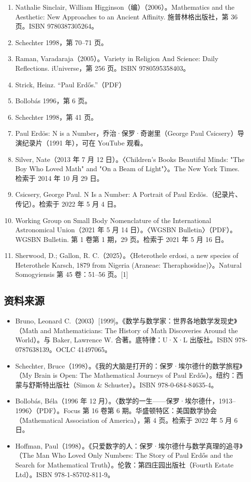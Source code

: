 \begin{enumerate}
\item Nathalie Sinclair, William Higginson（编）（2006）。Mathematics and the Aesthetic: New Approaches to an Ancient Affinity. 施普林格出版社，第 36 页。ISBN 9780387305264。
\item Schechter 1998，第 70–71 页。
\item Raman, Varadaraja（2005）。Variety in Religion And Science: Daily Reflections. iUniverse，第 256 页。ISBN 9780595358403。
\item Strick, Heinz. “Paul Erdős.”（PDF）
\item Bollobás 1996，第 6 页。
\item Schechter 1998，第 41 页。
\item Paul Erdös: N is a Number，乔治·保罗·奇谢里（George Paul Csicsery）导演纪录片（1991 年），可在 YouTube 观看。
\item Silver, Nate（2013 年 7 月 12 日）。〈Children’s Books Beautiful Minds: "The Boy Who Loved Math" and "On a Beam of Light"〉。The New York Times. 检索于 2014 年 10 月 29 日。
\item Csicsery, George Paul. N Is a Number: A Portrait of Paul Erdös.（纪录片、传记）。检索于 2022 年 5 月 4 日。
\item Working Group on Small Body Nomenclature of the International Astronomical Union（2021 年 5 月 14 日）。〈WGSBN Bulletin〉（PDF）。WGSBN Bulletin. 第 1 卷第 1 期，29 页。检索于 2021 年 5 月 16 日。
\item Sherwood, D.; Gallon, R. C.（2025）。〈Heterothele erdosi, a new species of Heterothele Karsch, 1879 from Nigeria (Araneae: Theraphosidae)〉。Natural Somogyiensis 第 45 卷：51–56 页。[1]
\end{enumerate}
\subsection{资料来源}
\begin{itemize}
\item Bruno, Leonard C.（2003）[1999]。《数学与数学家：世界各地数学发现史》（Math and Mathematicians: The History of Math Discoveries Around the World）。与 Baker, Lawrence W. 合著。底特律：U·X·L 出版社。ISBN 978-0787638139。OCLC 41497065。
\item Schechter, Bruce（1998）。《我的大脑是打开的：保罗·埃尔德什的数学旅程》（My Brain is Open: The Mathematical Journeys of Paul Erdős）。纽约：西蒙与舒斯特出版社（Simon & Schuster）。ISBN 978-0-684-84635-4。
\item Bollobás, Béla（1996 年 12 月）。〈数学的一生——保罗·埃尔德什，1913–1996〉（PDF）。Focus 第 16 卷第 6 期。华盛顿特区：美国数学协会（Mathematical Association of America），第 4 页。检索于 2022 年 5 月 6 日。
\item Hoffman, Paul（1998）。《只爱数字的人：保罗·埃尔德什与数学真理的追寻》（The Man Who Loved Only Numbers: The Story of Paul Erdős and the Search for Mathematical Truth）。伦敦：第四庄园出版社（Fourth Estate Ltd）。ISBN 978-1-85702-811-9。
\end{itemize}
